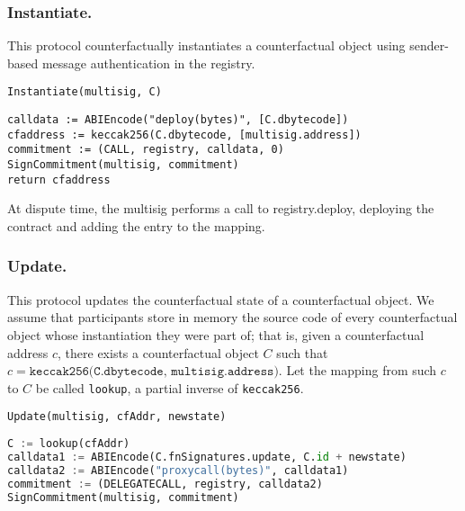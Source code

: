 \documentclass[prb,floatfix,reprint,nofootinbib,amsmath,amssymb,epsfig,pre,floats,letterpaper,groupedaffiliation,tightenlines,allcolors=blue,11pt]{revtex4}
\theoremstyle{definition}
\theoremstyle{definition}
\theoremstyle{definition}
\begin{document}
\subsubsection{Instantiate.} This protocol counterfactually instantiates a counterfactual object using sender-based message authentication in the registry.

\vspace{1.5em}
\begin{protocol}{\texttt{Instantiate(multisig, C)}}
\begin{lstlisting}
calldata := ABIEncode("deploy(bytes)", [C.dbytecode])
cfaddress := keccak256(C.dbytecode, [multisig.address])
commitment := (CALL, registry, calldata, 0)
SignCommitment(multisig, commitment)
return cfaddress
\end{lstlisting}
\end{protocol}
\vspace{1.5em}

At dispute time, the multisig performs a call to registry.deploy, deploying the contract and adding the entry to the mapping.

\begin{figure}[H]
    \centering
    
\end{figure}

\subsubsection{Update.} This protocol updates the counterfactual state of a counterfactual object. We assume that participants store in memory the source code of every counterfactual object whose instantiation they were part of; that is, given a counterfactual address $c$, there exists a counterfactual object $C$ such that $c = \texttt{keccak256(C.dbytecode, multisig.address)}$. Let the mapping from such $c$ to $C$ be called \texttt{lookup}, a partial inverse of \texttt{keccak256}.

\vspace{1.5em}
\begin{protocol}{\texttt{Update(multisig, cfAddr, newstate)}}
\begin{lstlisting}[language=Python]
C := lookup(cfAddr)
calldata1 := ABIEncode(C.fnSignatures.update, C.id + newstate)
calldata2 := ABIEncode("proxycall(bytes)", calldata1)
commitment := (DELEGATECALL, registry, calldata2)
SignCommitment(multisig, commitment)
\end{lstlisting}
\end{protocol}
\vspace{1.5em}
\end{document}
